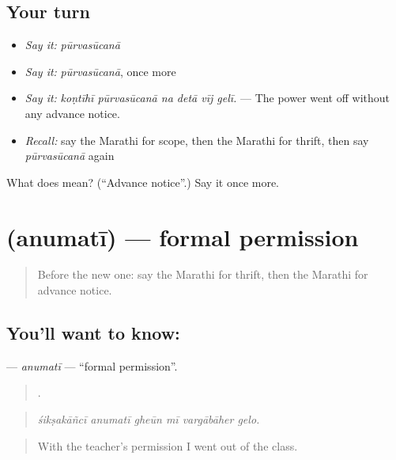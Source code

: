 \subsection*{Your turn}
\begin{itemize}
\raggedright
  \item \emph{Say it:} \emph{pūrvasūcanā}
  \item \emph{Say it:} \emph{pūrvasūcanā}, once more
  \item \emph{Say it:} \emph{koṇtīhī pūrvasūcanā na detā vīj gelī.} — The power went off without any advance notice.
  \item \emph{Recall:} say the Marathi for scope, then the Marathi for thrift, then say \emph{pūrvasūcanā} again
\end{itemize}

\begin{tcolorbox}[breakable,colback=teal!4,colframe=teal!35!black,title={Before you move on}]
What does  mean? (\textquotedblleft{}Advance notice\textquotedblright{}.) Say it once more.
\end{tcolorbox}
\section[\texorpdfstring{\mr{अनुमती} (anumatī)}{अनुमती (anumatī)}]{ (anumatī) — formal permission}

\label{lesson:MR-C557-anumati}



\begin{quote}
Before the new one: say the Marathi for thrift, then the Marathi for advance notice.
\end{quote}

\subsection*{You'll want to know: }
\textbf{} — \emph{anumatī} — \textquotedblleft{}formal permission\textquotedblright{}.

\begin{quote}
     .
\end{quote}

\begin{quote}
\emph{śikṣakāñcī anumatī gheūn mī vargābāher gelo.}
\end{quote}

\begin{quote}
With the teacher's permission I went out of the class.
\end{quote}

